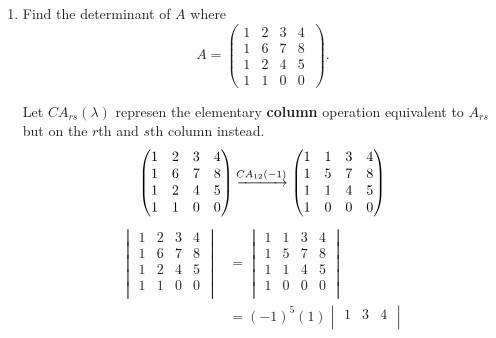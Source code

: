 \begin{example}
\begin{enumerate}
        \item Find the determinant of $A$ where
        \[
            A=
            \begin{pmatrix}
                1&2&3&4\\
                1&6&7&8\\
                1&2&4&5\\
                1&1&0&0\
            \end{pmatrix}
            .
        \]
        
        Let $CA_{rs}(\lambda)$ represen the elementary \textbf{column} operation equivalent to $A_{rs}$ but on the $r$th and $s$th column instead.
        \[
            \begin{pmatrix}
                1&2&3&4\\
                1&6&7&8\\
                1&2&4&5\\
                1&1&0&0\\
            \end{pmatrix}
            \eroarrow{CA_{12}(-1)}{}
            \begin{pmatrix}
                1&1&3&4\\
                1&5&7&8\\
                1&1&4&5\\
                1&0&0&0\\
            \end{pmatrix}
        \]
        \begin{align*}
            \begin{vmatrix}
                1&2&3&4\\
                1&6&7&8\\
                1&2&4&5\\
                1&1&0&0\\
            \end{vmatrix}
            &=
            \begin{vmatrix}
                1&1&3&4\\
                1&5&7&8\\
                1&1&4&5\\
                1&0&0&0\\
            \end{vmatrix}\\
            &=(-1)^{5}(1)
            \begin{vmatrix}
                1&3&4\\

\end{vmatrix}
\end{align*}
\end{enumerate}
\end{example}
